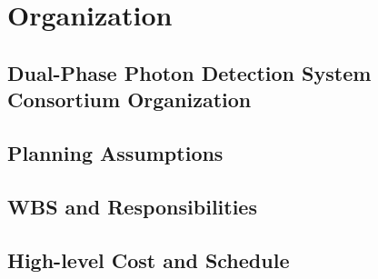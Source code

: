 


\section{Organization}
\label{sec:fddp-pd-org}

\subsection{Dual-Phase Photon Detection System Consortium Organization}
\label{sec:fddp-pd-org-consortium}


\subsection{Planning Assumptions}
\label{sec:fddp-pd-org-assmp}


\subsection{WBS and Responsibilities}
\label{sec:fddp-pd-org-wbs}

\subsection{High-level Cost and Schedule}
\label{sec:fddp-pd-org-cs}














